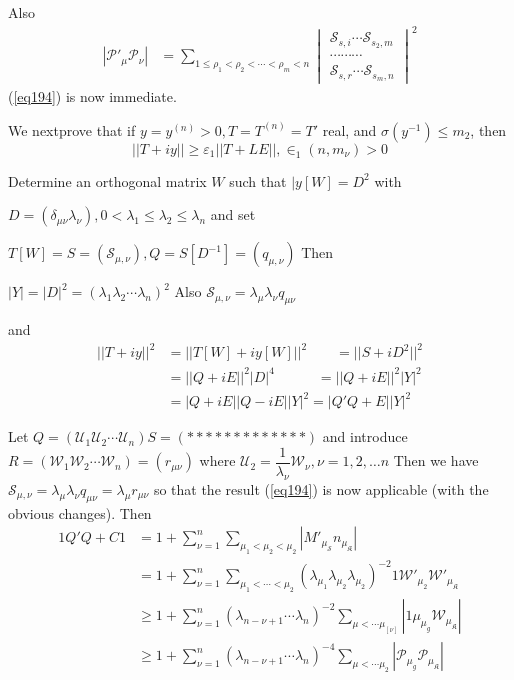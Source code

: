  Also
\begin{align*}
 |\mathscr{P}'_\mu \mathscr{P}_\nu|&= \sum_{1 \leq \rho_1< \rho_2 <
   \cdots < \rho_m < 
   n}\begin{vmatrix} \mathscr{S}_{s, i} \cdots \mathscr{S}_{s_2, m}
   \\ \cdots \cdots \cdots \\ \mathscr{S}_{s,r}\cdots
   \mathscr{S}_{s_m,n}\end{vmatrix}^2 
\end{align*}
(\ref{eq194}) is now immediate.

We next\pageoriginale prove that if $y=y^{(n)}>0, T=T^{(n)}=T'$  real,
and $\sigma (y^{-1}) \leq m_2$, then  
\begin{equation*}
||T+iy || \geq \varepsilon_1 ||T+LE ||, \in_1(n,m_\nu)>0
\tag{195}\label{eq195} 
\end{equation*}

Determine an orthogonal matrix $W$ such that $|y[W]=D^2$ with

 $D=(\delta_{\mu \nu}\lambda_\nu),0 < \lambda_1 \leq \lambda_2 \leq
\lambda_n$ and set 
 
 \noindent
$ T[W]=S=(\mathscr{S}_{\mu, \nu}), Q=S[D^{-1}]=(q_{\mu, \nu})$ Then

\noindent
$|Y|=|D|^2=(\lambda_1\lambda_2 \cdots \lambda_n)^2$ Also
$\mathscr{S}_{\mu, \nu}= \lambda_\mu \lambda_\nu q_{\mu \nu}$ 

\noindent
and
\begin{align*}
||T+iy||^2 &=||T[W]+iy[W]||^2 \qquad=|| S+iD^2 ||^2\\
&=||Q+iE||^2|D|^4\qquad \quad=||Q+iE||^2 |Y|^2\\
&=|Q+ iE ||Q-iE||Y|^2  = |Q'Q+E| |Y|^2\tag{196}\label{eq196}
\end{align*}

Let $Q=(\mathscr{U}_1\mathscr{U}_2\cdots \mathscr{U}_n)S=(*************)$ and
introduce $R=(\mathscr{W}_1 \mathscr{W}_2\cdots \mathscr{W}_n)=(r_{\mu
  \nu})$ where $\mathscr{U}_2=\dfrac{1}{\lambda_\nu}\mathscr{W}_\nu,
\nu=1,2,\ldots n$ Then we have $\mathscr{S}_{\mu, \nu}=\lambda_\mu
\lambda_\nu q_{\mu \nu}=\lambda_{\mu}r_{\mu \nu}$ so that the result
(\ref{eq194}) is now applicable (with the obvious changes). Then 
\begin{align*}
1Q'Q+C1 &=1+\sum_{\nu=1}^{n} \sum_{\mu_1<\mu_2<  \mu_2}
|M'_{\mu_\mathscr{S}}n_{\mu_\mathfrak{K}} |\\ 
&=1+\sum_{\nu=1}^{n}\sum_{\mu_1<\cdots
  <\mu_2}(\lambda_{\mu_1}\lambda_{\mu_2}
\lambda_{\mu_2})^{-2}1\mathscr{W}'_{\mu_2}\mathscr{W}'_{\mu_\mathfrak{K}}\\ 
&\geq 1+\sum_{\nu=1}^{n}(\lambda_{n-\nu+1}\cdots \lambda_n)^{-2}
\sum_{\mu < \cdots \mu_[\nu]}|1 \mu_{\mu_g}\mathscr{W}_{\mu_\mathfrak{K}}|\\ 
&\geq 1+ \sum_{\nu=1}^{n}(\lambda_{n-\nu+1 }\cdots \lambda_n)^{-4}
\sum_{\mu < \cdots \mu_2}| \mathscr{P}_{\mu_g}
\mathscr{P}_{\mu_\mathfrak{K}}|\tag{197} \label{eq197} 
\end{align*}

